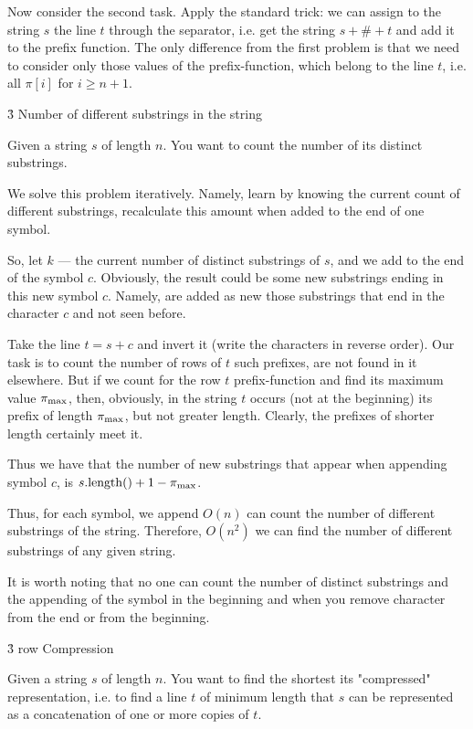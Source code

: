 Now consider the second task. Apply the standard trick: we can assign to the string $s$ the line $t$ through the separator, i.e. get the string $s+\#+t$ and add it to the prefix function. The only difference from the first problem is that we need to consider only those values of the prefix-function, which belong to the line $t$, i.e. all $\pi[i]$ for $i \ge n+1$.


\h3{ Number of different substrings in the string }

Given a string $s$ of length $n$. You want to count the number of its distinct substrings.

We solve this problem iteratively. Namely, learn by knowing the current count of different substrings, recalculate this amount when added to the end of one symbol.

So, let $k$ --- the current number of distinct substrings of $s$, and we add to the end of the symbol $c$. Obviously, the result could be some new substrings ending in this new symbol $c$. Namely, are added as new those substrings that end in the character $c$ and not seen before.

Take the line $t = s + c$ and invert it (write the characters in reverse order). Our task is to count the number of rows of $t$ such prefixes, are not found in it elsewhere. But if we count for the row $t$ prefix-function and find its maximum value $\pi_{\rm max}$, then, obviously, in the string $t$ occurs (not at the beginning) its prefix of length $\pi_{\rm max}$, but not greater length. Clearly, the prefixes of shorter length certainly meet it.

Thus we have that the number of new substrings that appear when appending symbol $c$, is $s.{\rm length}() + 1 - \pi_{\rm max}$.

Thus, for each symbol, we append $O(n)$ can count the number of different substrings of the string. Therefore, $O(n^2)$ we can find the number of different substrings of any given string.

It is worth noting that no one can count the number of distinct substrings and the appending of the symbol in the beginning and when you remove character from the end or from the beginning.


\h3{ row Compression }

Given a string $s$ of length $n$. You want to find the shortest its "compressed" representation, i.e. to find a line $t$ of minimum length that $s$ can be represented as a concatenation of one or more copies of $t$.

